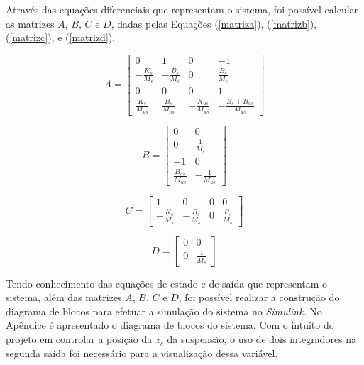 \documentclass[journal,brazil,english]{IEEEtran}
\begin{document}
Através das equações diferenciais que representam o sistema, foi possível calcular as matrizes $A$, $B$, $C$ e $D$, dadas pelas Equações (\ref{matriza}), (\ref{matrizb}), (\ref{matrizc}), e (\ref{matrizd}).

\begin{equation}\label{matriza}
A=\left[\begin{matrix}
0 & 1 & 0 & -1 \\
-\frac{K_s}{M_s} & -\frac{B_s}{M_s} & 0 & \frac{B_s}{M_s} \\
0 & 0 & 0 & 1 \\
\frac{K_s}{M_{us}} & \frac{B_s}{M_{us}} & -\frac{K_{us}}{M_{us}} & -\frac{B_s+B_{us}}{M_{us}}
\end{matrix} \right]
\end{equation}

\begin{equation}\label{matrizb}
B=\left[\begin{matrix}
0 & 0 \\
0 & \frac{1}{M_s} \\
-1 & 0 \\
\frac{B_{us}}{M_{us}} & -\frac{1}{M_{us}}
\end{matrix}\right]
\end{equation}

\begin{equation}\label{matrizc}
C=\left[\begin{matrix}
1 & 0 & 0 & 0 \\
-\frac{K_s}{M_s} & -\frac{B_s}{M_s} & 0 & \frac{B_s}{M_s}
\end{matrix}\right]
\end{equation}

\begin{equation}\label{matrizd}
D=\left[ \begin{matrix}
0 & 0 \\
0 & \frac{1}{M_s}
\end{matrix} \right]
\end{equation}

Tendo conhecimento das equações de estado e de saída que representam o sistema, além das matrizes $A$, $B$, $C$ e $D$, foi possível realizar a construção do diagrama de blocos para efetuar a simulação do sistema no \textit{Simulink}. No Apêndice é apresentado o diagrama de blocos do sistema. Com o intuito do projeto em controlar a posição da $z_s$ da suspensão, o uso de dois integradores na segunda saída foi necessário para a visualização dessa variável.
\end{document}
